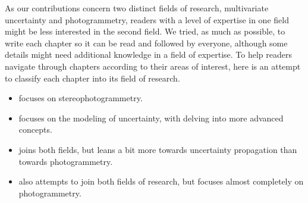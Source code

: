 As our contributions concern two distinct fields of research, multivariate uncertainty and photogrammetry, readers with a level of expertise in one field might be less interested in the second field. We tried, as much as possible, to write each chapter so it can be read and followed by everyone, although some details might need additional knowledge in a field of expertise. To help readers navigate through chapters according to their areas of interest, here is an attempt to classify each chapter into its field of research.
\begin{itemize}
    \item {} focuses on stereophotogrammetry.
    \item {} focuses on the modeling of uncertainty, with  delving into more advanced concepts.
    \item {} joins both fields, but leans a bit more towards uncertainty propagation than towards photogrammetry. 
    \item {} also attempts to join both fields of research, but focuses almost completely on photogrammetry.
\end{itemize}

